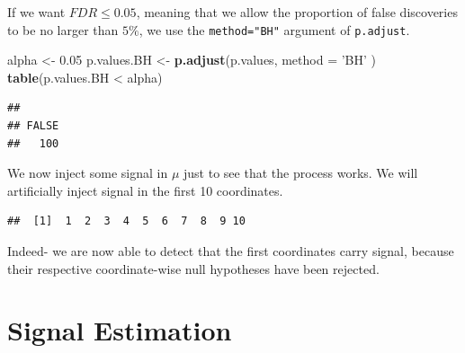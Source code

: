 \documentclass[]{book}
\newenvironment{Shaded}{\begin{snugshade}}{\end{snugshade}}
\newcommand{\KeywordTok}[1]{\textcolor[rgb]{0.13,0.29,0.53}{\textbf{{#1}}}}
\newcommand{\DataTypeTok}[1]{\textcolor[rgb]{0.13,0.29,0.53}{{#1}}}
\newcommand{\DecValTok}[1]{\textcolor[rgb]{0.00,0.00,0.81}{{#1}}}
\newcommand{\FloatTok}[1]{\textcolor[rgb]{0.00,0.00,0.81}{{#1}}}
\newcommand{\StringTok}[1]{\textcolor[rgb]{0.31,0.60,0.02}{{#1}}}
\newcommand{\CommentTok}[1]{\textcolor[rgb]{0.56,0.35,0.01}{\textit{{#1}}}}
\newcommand{\NormalTok}[1]{{#1}}
\theoremstyle{definition}
\theoremstyle{definition}
\theoremstyle{remark}
\begin{document}
If we want \(FDR \leq 0.05\), meaning that we allow the proportion of
false discoveries to be no larger than \(5\%\), we use the
\texttt{method="BH"} argument of \texttt{p.adjust}.

\begin{Shaded}
\begin{Highlighting}[]
\NormalTok{alpha <-}\StringTok{ }\FloatTok{0.05}
\NormalTok{p.values.BH <-}\StringTok{ }\KeywordTok{p.adjust}\NormalTok{(p.values, }\DataTypeTok{method =} \StringTok{'BH'} \NormalTok{)}
\KeywordTok{table}\NormalTok{(p.values.BH <}\StringTok{ }\NormalTok{alpha)}
\end{Highlighting}
\end{Shaded}

\begin{verbatim}
## 
## FALSE 
##   100
\end{verbatim}

We now inject some signal in \(\mu\) just to see that the process works.
We will artificially inject signal in the first 10 coordinates.

\begin{Shaded}
\end{Shaded}

\begin{verbatim}
##  [1]  1  2  3  4  5  6  7  8  9 10
\end{verbatim}

Indeed- we are now able to detect that the first coordinates carry
signal, because their respective coordinate-wise null hypotheses have
been rejected.

\section{Signal Estimation}\label{signal-estimation}
\end{document}
